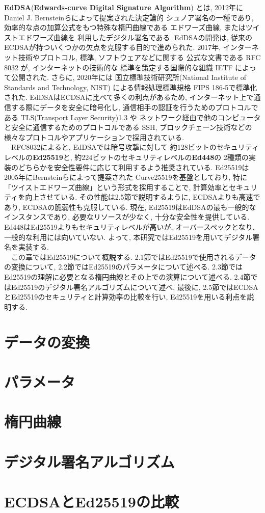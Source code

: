 \textbf{EdDSA}(\textbf{Edwards-curve Digital Signature Algorithm})
とは, 2012年にDaniel J. Bernsteinらによって提案された決定論的
シュノア署名\cite{schnorr}の一種であり, 効率的な点の加算公式をもつ特殊な楕円曲線である
エドワーズ曲線, またはツイストエドワーズ曲線\cite{twisted}を
利用したデジタル署名である.\cite{high-speed}
EdDSAの開発は, 従来のECDSAが持ついくつかの欠点を克服する目的で進められた.
2017年, インターネット技術やプロトコル, 標準, ソフトウェアなどに関する
公式な文書である RFC 8032 \cite{8032}が, インターネットの技術的な
標準を策定する国際的な組織 IETF によって公開された.
さらに, 2020年には
国立標準技術研究所(National Institute of Standards and Technology, NIST)
による情報処理標準規格 FIPS 186-5で標準化された.
EdDSAはECDSAに比べて多くの利点があるため, 
インターネット上で通信する際にデータを安全に暗号化し, 
通信相手の認証を行うためのプロトコルである 
TLS(Transport Layer Security)1.3 \cite{rfc8446}や
ネットワーク経由で他のコンピュータと安全に通信するためのプロトコルである 
SSH, ブロックチェーン技術などの
様々なプロトコルやアプリケーションで採用されている\cite{monero}.\\
　RFC8032によると, EdDSAでは暗号攻撃に対して
約128ビットのセキュリティレベルの\textbf{Ed25519}と, 
約224ビットのセキュリティレベルの\textbf{Ed448}の
2種類の実装のどちらかを安全性要件に応じて利用するよう推奨されている.
Ed25519は2005年にBernsteinらによって提案された
Curve25519\cite{curve25519}を基盤としており, 特に
「ツイストエドワーズ曲線」という形式を採用することで, 
計算効率とセキュリティを向上させている.
その性能は2.5節で説明するように, ECDSAよりも高速であり, 
ECDSAの脆弱性も克服している.
現在, Ed25519はEdDSAの最も一般的なインスタンスであり, 
必要なリソースが少なく, 十分な安全性を提供している.
Ed448はEd25519よりもセキュリティレベルが高いが,
オーバースペックとなり, 一般的な利用には向いていない.
よって, 本研究ではEd25519を用いてデジタル署名を実装する.\\
　この章ではEd25519について概説する.
2.1節ではEd25519で使用されるデータの変換について, 
2.2節ではEd25519のパラメータについて述べる.
2.3節ではEd25519の理解に必要となる楕円曲線とその上での演算について述べる.
2.4節ではEd25519のデジタル署名アルゴリズムについて述べ,
最後に, 2.5節ではECDSAとEd25519のセキュリティと計算効率の比較を行い, 
Ed25519を用いる利点を説明する.\\
\section{データの変換}

\section{パラメータ}

\section{楕円曲線}

\section{デジタル署名アルゴリズム}

\section{ECDSAとEd25519の比較}
